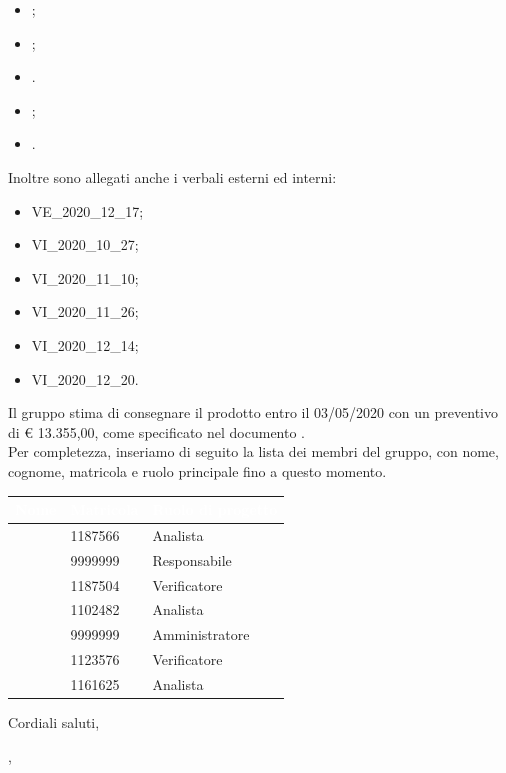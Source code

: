 \documentclass[11pt]{letter}
\begin{document}
\begin{letter}
\begin{itemize}
            \item {};
            \item {};
            \item {}.
            \item {};
            \item {}.
        \end{itemize}
        Inoltre sono allegati anche i verbali esterni ed interni:
        \begin{itemize}
            \item VE\_2020\_12\_17;
            \item VI\_2020\_10\_27;
            \item VI\_2020\_11\_10;
            \item VI\_2020\_11\_26;
            \item VI\_2020\_12\_14;
            \item VI\_2020\_12\_20.
        \end{itemize}
        Il gruppo stima di consegnare il prodotto entro il 03/05/2020 con un preventivo di \euro{} 13.355,00, come specificato nel documento .\\
        Per completezza, inseriamo di seguito la lista dei membri del gruppo, con nome, cognome, matricola e ruolo principale fino a questo momento.
        {
            \renewcommand{\arraystretch}{2}
            \begin{longtable}{ C{4cm} C{4cm} C{4cm}}
                \textcolor{white}{\textbf{Nome}} & \textcolor{white}{\textbf{Matricola}} & \textcolor{white}{\textbf{Ruolo di progetto}}\\
                \endhead 
                \SG{} & 1187566 & Analista \\
                \BM{} & 9999999 & Responsabile \\
                \RA{} & 1187504 & Verificatore \\
                \SH{} & 1102482 & Analista \\
                \PA{} & 9999999 & Amministratore \\
                \ZM{} & 1123576 & Verificatore \\
                \SP{} & 1161625 & Analista \\
            \end{longtable}
        }
        Cordiali saluti,
        \closing{\BM{}, \\ \textit{\Responsabile{}}} %
    \end{letter}
\end{document}

